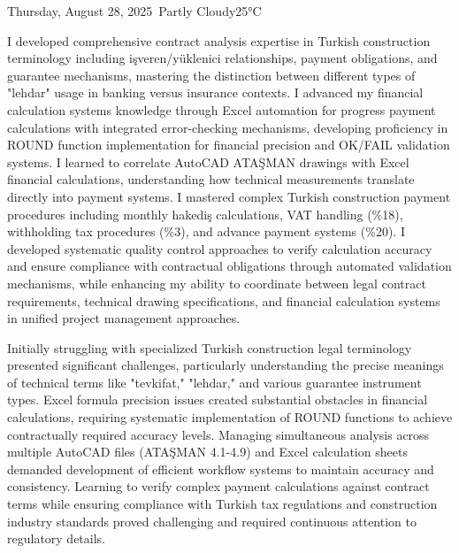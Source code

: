 \begin{dailyentry}{Thursday, August 28, 2025}{\weathercloudy\ Partly Cloudy}{25°C}
\begin{skillslearned}
\item[] I developed comprehensive contract analysis expertise in Turkish construction terminology including işveren/yüklenici relationships, payment obligations, and guarantee mechanisms, mastering the distinction between different types of "lehdar" usage in banking versus insurance contexts. I advanced my financial calculation systems knowledge through Excel automation for progress payment calculations with integrated error-checking mechanisms, developing proficiency in ROUND function implementation for financial precision and OK/FAIL validation systems. I learned to correlate AutoCAD ATAŞMAN drawings with Excel financial calculations, understanding how technical measurements translate directly into payment systems. I mastered complex Turkish construction payment procedures including monthly hakediş calculations, VAT handling (\%18), withholding tax procedures (\%3), and advance payment systems (\%20). I developed systematic quality control approaches to verify calculation accuracy and ensure compliance with contractual obligations through automated validation mechanisms, while enhancing my ability to coordinate between legal contract requirements, technical drawing specifications, and financial calculation systems in unified project management approaches.
\end{skillslearned}

\begin{challenges}
\item[] Initially struggling with specialized Turkish construction legal terminology presented significant challenges, particularly understanding the precise meanings of technical terms like "tevkifat," "lehdar," and various guarantee instrument types. Excel formula precision issues created substantial obstacles in financial calculations, requiring systematic implementation of ROUND functions to achieve contractually required accuracy levels. Managing simultaneous analysis across multiple AutoCAD files (ATAŞMAN 4.1-4.9) and Excel calculation sheets demanded development of efficient workflow systems to maintain accuracy and consistency. Learning to verify complex payment calculations against contract terms while ensuring compliance with Turkish tax regulations and construction industry standards proved challenging and required continuous attention to regulatory details.
\end{challenges}

\vspace{1cm}


\end{dailyentry}
